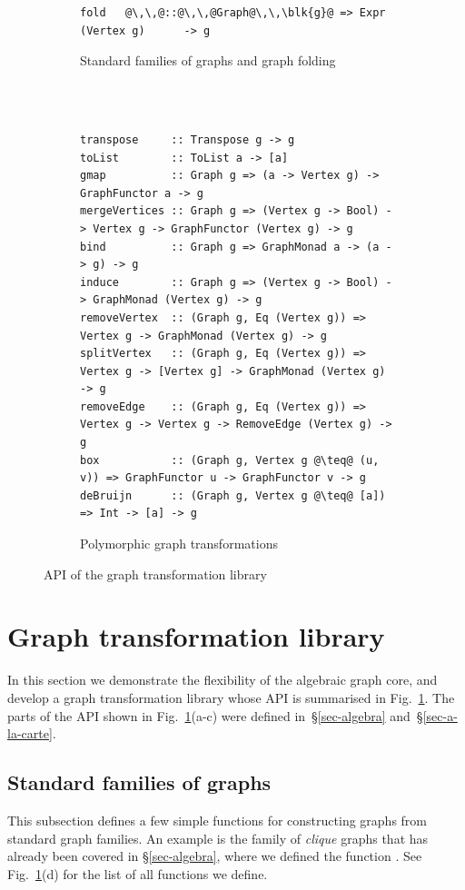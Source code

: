 \begin{figure}
\begin{subfigure}[b]{0.47\linewidth}
\begin{verbatim}
fold   @\,\,@::@\,\,@Graph@\,\,\blk{g}@ => Expr   (Vertex g)      -> g
\end{verbatim}
\caption{Standard families of graphs and graph folding}
\end{subfigure}
~\\
~\\
\begin{subfigure}[b]{\linewidth}
\begin{verbatim}
transpose     :: Transpose g -> g
toList        :: ToList a -> [a]
gmap          :: Graph g => (a -> Vertex g) -> GraphFunctor a -> g
mergeVertices :: Graph g => (Vertex g -> Bool) -> Vertex g -> GraphFunctor (Vertex g) -> g
bind          :: Graph g => GraphMonad a -> (a -> g) -> g
induce        :: Graph g => (Vertex g -> Bool) -> GraphMonad (Vertex g) -> g
removeVertex  :: (Graph g, Eq (Vertex g)) => Vertex g -> GraphMonad (Vertex g) -> g
splitVertex   :: (Graph g, Eq (Vertex g)) => Vertex g -> [Vertex g] -> GraphMonad (Vertex g) -> g
removeEdge    :: (Graph g, Eq (Vertex g)) => Vertex g -> Vertex g -> RemoveEdge (Vertex g) -> g
box           :: (Graph g, Vertex g @\teq@ (u, v)) => GraphFunctor u -> GraphFunctor v -> g
deBruijn      :: (Graph g, Vertex g @\teq@ [a]) => Int -> [a] -> g
\end{verbatim}
\caption{Polymorphic graph transformations}
\end{subfigure}
\vspace{-3mm}
\caption{API of the graph transformation library\label{fig-api}}
\end{figure}

\newpage
\section{Graph transformation library}\label{sec-transformations}

In this section we demonstrate the flexibility of the algebraic graph core,
and develop a graph transformation library whose API is summarised in
Fig.~\ref{fig-api}. The parts of the API shown in Fig.~\ref{fig-api}(a-c)
were defined in~\S\ref{sec-algebra} and~\S\ref{sec-a-la-carte}.

\subsection{Standard families of graphs}\label{sub-families}

This subsection defines a few simple functions for constructing graphs from
standard graph families. An example is the family of \emph{clique} graphs that has
already been covered in \S\ref{sec-algebra}, where we defined the function
. See Fig.~\ref{fig-api}(d) for the list of all functions we define.

